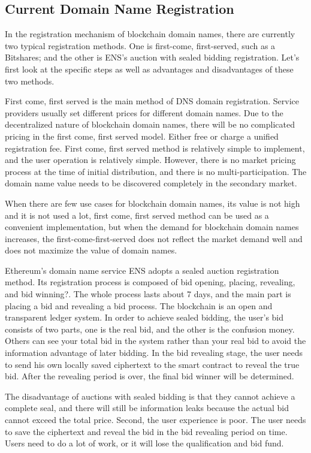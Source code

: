 \documentclass[letterpaper,10pt,english]{sphinxmanual}
\begin{document}
\subsection{Current Domain Name Registration}
\label{\detokenize{nns_protocol:current-domain-name-registration}}
In the registration mechanism of blockchain domain names, there are currently two typical registration methods.
One is first-come, first-served, such as a Bitshares; and the other is ENS’s auction with sealed bidding registration.
Let’s first look at the specific steps as well as advantages and disadvantages of these two methods.

First come, first served is the main method of DNS domain registration.
Service providers usually set different prices for different domain names.
Due to the decentralized nature of blockchain domain names, there will be no complicated pricing in the
first come, first served model. Either free or charge a unified registration fee.
First come, first served method is relatively simple to implement, and the user operation is relatively simple.
However, there is no market pricing process at the time of initial distribution, and there is no multi-participation.
The domain name value needs to be discovered completely in the secondary market.

When there are few use cases for blockchain domain names, its value is not high and it is not used a lot,
first come, first served method can be used as a convenient implementation, but when the demand for blockchain domain names increases,
the first-come-first-served does not reflect the market demand well and does not maximize the value of domain names.

Ethereum’s domain name service ENS adopts a sealed auction registration method.
Its registration process is composed of bid opening, placing, revealing, and bid winning?.
The whole process lasts about 7 days, and the main part is placing a bid and revealing a bid process.
The blockchain is an open and transparent ledger system. In order to achieve sealed bidding, the user’s bid consists of two parts,
one is the real bid, and the other is the confusion money.
Others can see your total bid in the system rather than your real bid to avoid the information advantage of later bidding.
In the bid revealing stage, the user needs to send his own locally saved ciphertext to the smart contract to reveal the true bid.
After the revealing period is over, the final bid winner will be determined.

The disadvantage of auctions with sealed bidding is that they cannot achieve a complete seal,
and there will still be information leaks because the actual bid cannot exceed the total price.
Second, the user experience is poor. The user needs to save the ciphertext and reveal the bid in the bid revealing period on time.
Users need to do a lot of work, or it will lose the qualification and bid fund.
\end{document}
